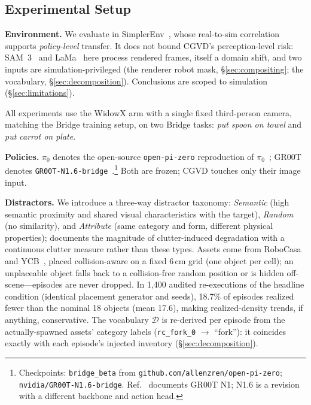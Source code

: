 \documentclass[letterpaper, 10 pt, conference]{ieeeconf}  %
\begin{document}
\subsection{Experimental Setup}
\label{sec:setup}
\textbf{Environment.} We evaluate in SimplerEnv~\cite{simplerenv}, whose real-to-sim correlation supports \emph{policy-level} transfer. It does not bound CGVD's perception-level risk: SAM~3~\cite{sam3} and LaMa~\cite{lama} here process rendered frames, itself a domain shift, and two inputs are simulation-privileged (the renderer robot mask, \S\ref{sec:compositing}; the vocabulary, \S\ref{sec:decomposition}). Conclusions are scoped to simulation (\S\ref{sec:limitations}).

All experiments use the WidowX arm with a single fixed third-person camera, matching the Bridge training setup, on two Bridge tasks: \textit{put spoon on towel} and \textit{put carrot on plate}.

\textbf{Policies.} $\pi_0$ denotes the open-source \texttt{open-pi-zero} reproduction of $\pi_0$~\cite{pi0}; GR00T denotes \texttt{GR00T-N1.6-bridge}~\cite{gr00t}.\footnote{Checkpoints: \texttt{bridge\_beta} from \texttt{github.com/allenzren/open-pi-zero}; \texttt{nvidia/GR00T-N1.6-bridge}. Ref.~\cite{gr00t} documents GR00T N1; N1.6 is a revision with a different backbone and action head.} Both are frozen; CGVD touches only their image input.

\textbf{Distractors.} We introduce a three-way distractor taxonomy: \textit{Semantic} (high semantic proximity and shared visual characteristics with the target), \textit{Random} (no similarity), and \textit{Attribute} (same category and form, different physical properties); \cite{distracted_robot} documents the magnitude of clutter-induced degradation with a continuous clutter measure rather than these types. Assets come from RoboCasa~\cite{robocasa} and YCB~\cite{ycb}, placed collision-aware on a fixed 6\,cm grid (one object per cell); an unplaceable object falls back to a collision-free random position or is hidden off-scene---episodes are never dropped. In 1,400 audited re-executions of the headline condition (identical placement generator and seeds), 18.7\% of episodes realized fewer than the nominal 18 objects (mean 17.6), making realized-density trends, if anything, conservative. The vocabulary $\mathcal{D}$ is re-derived per episode from the actually-spawned assets' category labels (\texttt{rc\_fork\_0} $\rightarrow$ ``fork''): it coincides exactly with each episode's injected inventory (\S\ref{sec:decomposition}).
\end{document}
